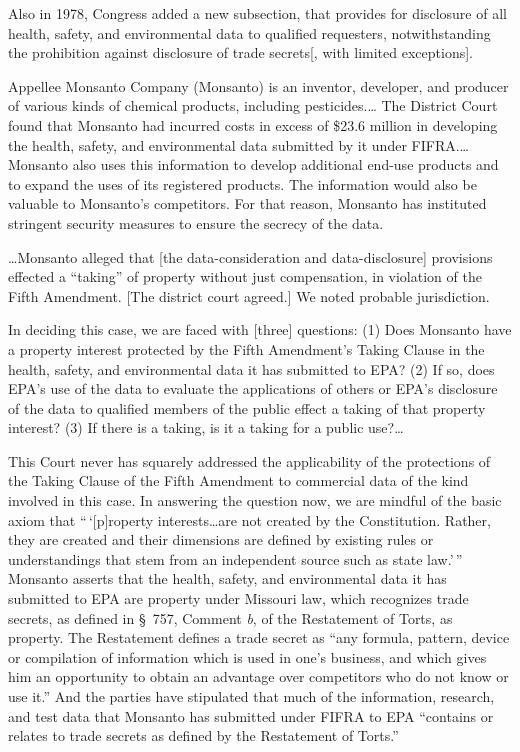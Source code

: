 Also in 1978, Congress added a new subsection,
that provides for disclosure of all health,  safety, and environmental data to
qualified requesters, notwithstanding the prohibition against disclosure of
trade secrets[, with limited exceptions].



Appellee Monsanto Company (Monsanto) is an inventor, developer, and producer of
various kinds of chemical products, including pesticides.\ldots
The District Court found that
Monsanto had incurred costs in excess of \$23.6 million in developing the
health, safety, and environmental data submitted by it under FIFRA.\ldots
Monsanto also uses this information to develop additional end-use
products and to expand the uses of its registered products. The information
would also be valuable to Monsanto's competitors. For that reason, Monsanto has
instituted stringent security measures to ensure the secrecy of the data.

\ldots Monsanto alleged that [the data-consideration and data-disclosure]
provisions effected a ``taking'' of property without just compensation, in
violation of the Fifth Amendment. [The district court agreed.]
We noted probable jurisdiction.




In deciding this case, we are faced with [three] questions: (1) Does Monsanto have
a property interest protected by the Fifth Amendment's Taking Clause in the
health, safety, and environmental data it has submitted to EPA? (2) If so, does
EPA's use of the data to evaluate the applications of others or EPA's disclosure
of the data to qualified members of the public effect a taking of that property
interest? (3) If there  is a taking, is it a taking for a public
use?\ldots{}

This Court never has squarely addressed the applicability of the protections of
the Taking Clause of the Fifth Amendment to commercial data of the kind involved
in this case. In answering the question now, we are mindful of the basic axiom
that ``\,`[p]roperty interests\ldots are not created by the Constitution.
Rather,
they are created and their dimensions are defined by existing rules or
understandings that stem from an independent source such as state law.'\,''
Monsanto asserts that the health, safety, and environmental data it
has submitted to EPA are property under Missouri law, which recognizes trade
secrets, as defined in \S~757, Comment \textit{b}, of the Restatement of Torts,
as property.
The Restatement defines a trade secret as ``any formula,
pattern, device or compilation of information which is used in one's business,
and which gives him an opportunity to obtain an advantage over competitors who
do not know or use it.'' And the parties have
stipulated that much of the information, research, and test data that Monsanto
has submitted under  FIFRA to EPA ``contains or relates to trade secrets as
defined by the Restatement of Torts.''

